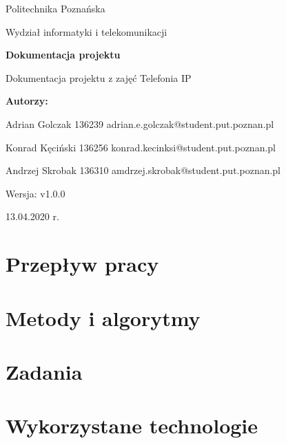 \documentclass{article}
\newcommand{\version}{v1.0.0}
\begin{document}
\begin{titlepage}
		\begin{center}
			
						\LARGE
			Politechnika Poznańska
			
			\vspace{0.3cm}
			
			\large
			Wydział informatyki i telekomunikacji
			
			\vspace{3.0cm}
			\huge
			\textbf{Dokumentacja projektu}
			
			\vspace{0.5cm}
			
			\large
			Dokumentacja projektu z zajęć Telefonia IP
			
			\vspace{2.4cm}
			
			\LARGE
			\textbf{Autorzy:}
			
			\vspace{0.3cm}
			
			Adrian Golczak 136239
			adrian.e.golczak@student.put.poznan.pl
			
			\vspace{1.0cm}
			
			Konrad Kęciński 136256
			konrad.kecinksi@student.put.poznan.pl
			
			\vspace{1.0cm}
			
			Andrzej Skrobak 136310
			amdrzej.skrobak@student.put.poznan.pl
			
			\vspace{0.3cm}

			\vfill
			
			\normalsize
			Wersja: \version
			
			\vspace{2cm}
			

			
			13.04.2020 r.
			
		\end{center}
\end{titlepage}
\tableofcontents
\newpage
	\section{Przepływ pracy}
	
	\section{Metody i algorytmy}
	
	\section{Zadania}
	
	\section{Wykorzystane technologie}
	
\end{document}
